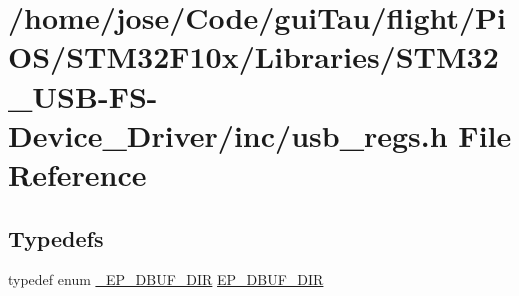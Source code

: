 \hypertarget{_s_t_m32_f10x_2_libraries_2_s_t_m32___u_s_b-_f_s-_device___driver_2inc_2usb__regs_8h}{\section{/home/jose/\-Code/gui\-Tau/flight/\-Pi\-O\-S/\-S\-T\-M32\-F10x/\-Libraries/\-S\-T\-M32\-\_\-\-U\-S\-B-\/\-F\-S-\/\-Device\-\_\-\-Driver/inc/usb\-\_\-regs.h File Reference}
\label{_s_t_m32_f10x_2_libraries_2_s_t_m32___u_s_b-_f_s-_device___driver_2inc_2usb__regs_8h}
}
\subsection*{Typedefs}
\begin{DoxyCompactItemize}
\item 
typedef enum \hyperlink{_s_t_m32_f10x_2_libraries_2_s_t_m32___u_s_b-_f_s-_device___driver_2inc_2usb__regs_8h_a1cc7345c82090e4a88480f96f5d0d802}{\-\_\-\-E\-P\-\_\-\-D\-B\-U\-F\-\_\-\-D\-I\-R} \hyperlink{_s_t_m32_f10x_2_libraries_2_s_t_m32___u_s_b-_f_s-_device___driver_2inc_2usb__regs_8h_abece26f40c007d1794916066fa950085}{E\-P\-\_\-\-D\-B\-U\-F\-\_\-\-D\-I\-R}
\end{DoxyCompactItemize}
